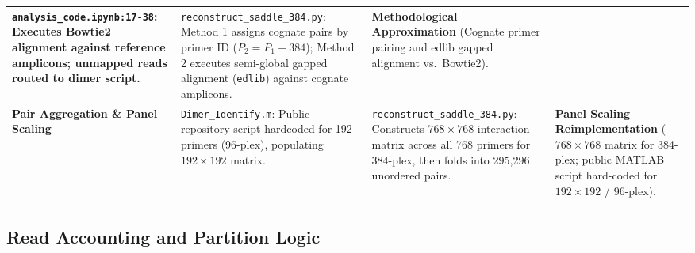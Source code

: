 \documentclass[
]{article}
\begin{document}
\begin{table}[htbp]
\begin{tabularx}{\textwidth}{@{} >{\bfseries}p{2.8cm} >{\raggedright}p{4.4cm} >{\raggedright}p{4.4cm} >{\raggedright\arraybackslash}X @{}}
\texttt{analysis\_code.ipynb:17-38}: Executes Bowtie2 alignment against reference amplicons; unmapped reads routed to dimer script. &
\texttt{reconstruct\_saddle\_384.py}: Method 1 assigns cognate pairs by primer ID ($P_2 = P_1 + 384$); Method 2 executes semi-global gapped alignment (\texttt{edlib}) against cognate amplicons. &
\textbf{Methodological Approximation} (Cognate primer pairing and edlib gapped alignment vs.\ Bowtie2). \\
\addlinespace
Pair Aggregation \& Panel Scaling &
\texttt{Dimer\_Identify.m}: Public repository script hardcoded for 192 primers (96-plex), populating $192 \times 192$ matrix. &
\texttt{reconstruct\_saddle\_384.py}: Constructs $768 \times 768$ interaction matrix across all 768 primers for 384-plex, then folds into 295,296 unordered pairs. &
\textbf{Panel Scaling Reimplementation} ($768 \times 768$ matrix for 384-plex; public MATLAB script hard-coded for $192 \times 192$ / 96-plex). \\
\bottomrule
\end{tabularx}
\end{table}

\subsection{Read Accounting and Partition
Logic}\label{read-accounting-and-partition-logic}
\end{document}
